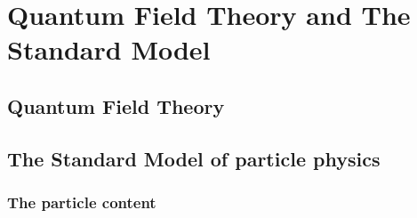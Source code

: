 \chapter{Quantum Field Theory and The Standard Model}

\section{Quantum Field Theory}

\section{The Standard Model of particle physics}
\subsection{The particle content}

